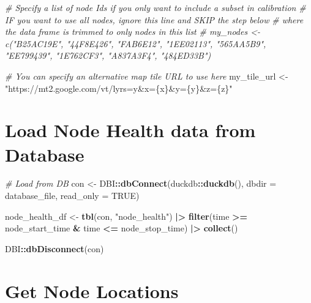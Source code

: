 \documentclass[
]{book}
\newenvironment{Shaded}{\begin{snugshade}}{\end{snugshade}}
\newcommand{\AttributeTok}[1]{\textcolor[rgb]{0.13,0.29,0.53}{#1}}
\newcommand{\CommentTok}[1]{\textcolor[rgb]{0.56,0.35,0.01}{\textit{#1}}}
\newcommand{\ConstantTok}[1]{\textcolor[rgb]{0.56,0.35,0.01}{#1}}
\newcommand{\FunctionTok}[1]{\textcolor[rgb]{0.13,0.29,0.53}{\textbf{#1}}}
\newcommand{\NormalTok}[1]{#1}
\newcommand{\OtherTok}[1]{\textcolor[rgb]{0.56,0.35,0.01}{#1}}
\newcommand{\SpecialCharTok}[1]{\textcolor[rgb]{0.81,0.36,0.00}{\textbf{#1}}}
\newcommand{\StringTok}[1]{\textcolor[rgb]{0.31,0.60,0.02}{#1}}
\begin{document}
\begin{Shaded}
\begin{Highlighting}[]
\CommentTok{\# Specify a list of node Ids if you only want to include a subset in calibration}
\CommentTok{\# IF you want to use all nodes, ignore this line and SKIP the step below}
\CommentTok{\# where the data frame is trimmed to only nodes in this list}
\CommentTok{\# my\_nodes \textless{}{-} c("B25AC19E", "44F8E426", "FAB6E12", "1EE02113", "565AA5B9", "EE799439", "1E762CF3", "A837A3F4", "484ED33B")}

\CommentTok{\# You can specify an alternative map tile URL to use here}
\NormalTok{my\_tile\_url }\OtherTok{\textless{}{-}} \StringTok{"https://mt2.google.com/vt/lyrs=y\&x=\{x\}\&y=\{y\}\&z=\{z\}"}
\end{Highlighting}
\end{Shaded}

\section{Load Node Health data from Database}\label{load-node-health-data-from-database}

\begin{Shaded}
\begin{Highlighting}[]
\CommentTok{\# Load from DB}
\NormalTok{con }\OtherTok{\textless{}{-}}\NormalTok{ DBI}\SpecialCharTok{::}\FunctionTok{dbConnect}\NormalTok{(duckdb}\SpecialCharTok{::}\FunctionTok{duckdb}\NormalTok{(), }
                      \AttributeTok{dbdir =}\NormalTok{ database\_file, }
                      \AttributeTok{read\_only =} \ConstantTok{TRUE}\NormalTok{)}

\NormalTok{node\_health\_df }\OtherTok{\textless{}{-}} \FunctionTok{tbl}\NormalTok{(con, }\StringTok{"node\_health"}\NormalTok{) }\SpecialCharTok{|\textgreater{}}
  \FunctionTok{filter}\NormalTok{(time }\SpecialCharTok{\textgreater{}=}\NormalTok{ node\_start\_time }\SpecialCharTok{\&}\NormalTok{ time }\SpecialCharTok{\textless{}=}\NormalTok{ node\_stop\_time) }\SpecialCharTok{|\textgreater{}}
  \FunctionTok{collect}\NormalTok{()}

\NormalTok{DBI}\SpecialCharTok{::}\FunctionTok{dbDisconnect}\NormalTok{(con)}
\end{Highlighting}
\end{Shaded}

\section{Get Node Locations}\label{get-node-locations-2}
\end{document}
